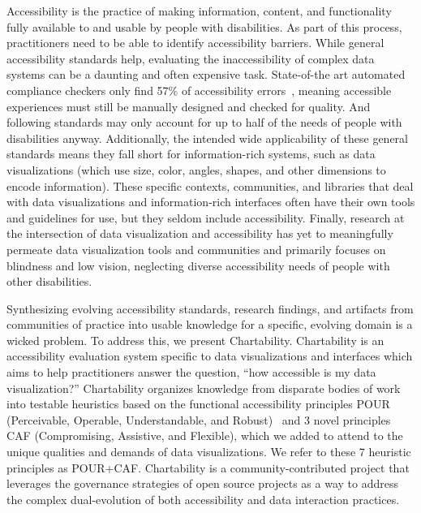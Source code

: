 \documentclass{egpubl}
\begin{document}
Accessibility is the practice of making information, content, and functionality fully available to and usable by people with disabilities. As part of this process, practitioners need to be able to identify accessibility barriers. While general accessibility standards help, evaluating the inaccessibility of complex data systems can be a daunting and often expensive task. State-of-the art automated compliance checkers only find 57\% of accessibility errors~\cite{noauthor_study_2021}, meaning accessible experiences must still be manually designed and checked for quality. And following standards may only account for up to half of the needs of people with disabilities \cite{power_2012} anyway. Additionally, the intended wide applicability of these general standards means they fall short for information-rich systems, such as data visualizations (which use size, color, angles, shapes, and other dimensions to encode information). These specific contexts, communities, and libraries that deal with data visualizations and information-rich interfaces often have their own tools and guidelines for use, but they seldom include accessibility. Finally, research at the intersection of data visualization and accessibility has yet to meaningfully permeate data visualization tools and communities and primarily focuses on blindness and low vision, neglecting diverse accessibility needs of people with other disabilities.  

Synthesizing evolving accessibility standards, research findings, and artifacts from communities of practice into usable knowledge for a specific, evolving domain is a wicked problem. To address this, we present Chartability. Chartability is an accessibility evaluation system specific to data visualizations and interfaces which aims to help practitioners answer the question, ``how accessible is my data visualization?'' Chartability organizes knowledge from disparate bodies of work into testable heuristics based on the functional accessibility principles POUR (Perceivable, Operable, Understandable, and Robust)~\cite{initiative_wai_accessibility_nodate} and 3 novel principles CAF (Compromising, Assistive, and Flexible), which we added to attend to the unique qualities and demands of data visualizations. We refer to these 7 heuristic principles as POUR+CAF. Chartability is a community-contributed project that leverages the governance strategies of open source projects as a way to address the complex dual-evolution of both accessibility and data interaction practices. 
\end{document}
